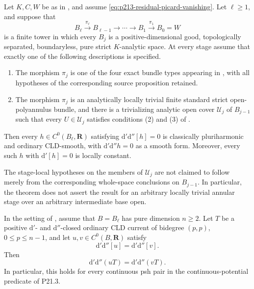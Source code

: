 \begin{theorem}
\label{thm:p213-residual-picard-stage-local-annular-tower}
Let $K,C,W$ be as in
, and assume
\eqref{eq:p213-residual-picard-vanishing}.  Let $\ell\geq1$, and suppose
that
\[
 B_\ell\xrightarrow{\pi_\ell}B_{\ell-1}
 \longrightarrow\cdots\longrightarrow B_1
 \xrightarrow{\pi_1}B_0=W
\]
is a finite tower in which every $B_j$ is a positive-dimensional good,
topologically separated, boundaryless, pure strict $K$-analytic space.
At every stage assume that exactly one of the following descriptions is
specified.
\begin{enumerate}
\item The morphism $\pi_j$ is one of the four exact bundle types appearing
in , with all hypotheses
of the corresponding source proposition retained.
\item The morphism $\pi_j$ is an analytically locally trivial finite
standard strict open-polyannulus bundle, and there is a trivializing
analytic open cover $\mathcal U_j$ of $B_{j-1}$ such that every
$U\in\mathcal U_j$ satisfies conditions \textup{(2)} and \textup{(3)} of
.
\end{enumerate}
Then every $h\in C^0(B_\ell,\mathbf R)$ satisfying
$\mathrm d'\mathrm d''[h]=0$ is classically pluriharmonic and ordinary
CLD-smooth, with $\mathrm d'\mathrm d''h=0$ as a smooth form.  Moreover,
every such $h$ with $\mathrm d'[h]=0$ is locally constant.

The stage-local hypotheses on the members of $\mathcal U_j$ are not
claimed to follow merely from the corresponding whole-space conclusions
on $B_{j-1}$.  In particular, the theorem does not assert the result for
an arbitrary locally trivial annular stage over an arbitrary intermediate
base open.
\end{theorem}

\begin{corollary}
\label{cor:p213-residual-picard-stage-local-annular-tower-bt}
In the setting of
, assume that
$B=B_\ell$ has pure dimension $n\geq2$.  Let $T$ be a positive
$\mathrm d'$- and $\mathrm d''$-closed ordinary CLD current of bidegree
$(p,p)$, $0\leq p\leq n-1$, and let $u,v\in C^0(B,\mathbf R)$ satisfy
\[
                         \mathrm d'\mathrm d''[u]
                         =\mathrm d'\mathrm d''[v].
\]
Then
\[
                         \mathrm d'\mathrm d''(uT)
                         =\mathrm d'\mathrm d''(vT).
\]
In particular, this holds for every continuous psh pair in the
continuous-potential predicate of P21.3.
\end{corollary}

